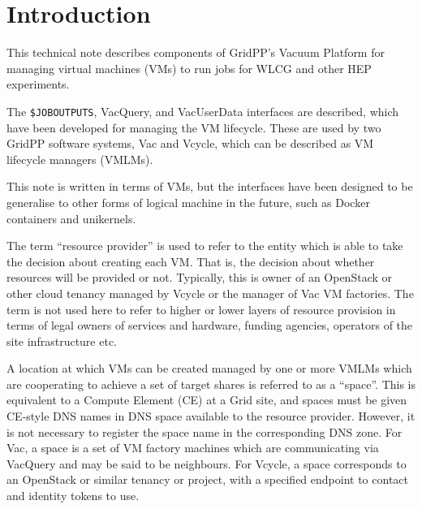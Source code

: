 \documentclass[12pt,a4paper]{article}
\begin{document}
\cleardoublepage

\renewcommand{\thefootnote}{\arabic{footnote}}
\setcounter{footnote}{0}

\tableofcontents

\pagestyle{plain} %
\setcounter{page}{1}


\section{Introduction}
\label{sec:Introduction}

This technical note describes components of GridPP's Vacuum Platform for 
managing virtual machines (VMs) to run jobs for WLCG and other HEP 
experiments.

The \texttt{\$JOBOUTPUTS}, VacQuery, and VacUserData interfaces are described, 
which have been developed for managing the VM lifecycle. These are used 
by two GridPP software systems, Vac and Vcycle, which can be described 
as VM lifecycle managers (VMLMs).

This note is written in terms of VMs, but the interfaces have been 
designed to be generalise to other forms of logical machine in the
future, such as Docker containers and unikernels.

The term ``resource provider'' is used to refer to the entity which is 
able to take the decision about creating each VM. That is, the decision 
about whether resources will be provided or not. Typically, this is owner 
of an OpenStack or other cloud tenancy managed by Vcycle or the manager of Vac VM 
factories. The term is not used here to refer to higher or lower layers of resource
provision in terms of legal owners of services and hardware, funding
agencies, operators of the site infrastructure etc.

A location at which VMs can be created managed by one or more VMLMs
which are cooperating to achieve a set of target shares is referred to
as a ``space''. This is equivalent to a Compute Element (CE) at a Grid site,
and spaces must be given CE-style DNS names in DNS space available to the
resource provider. However, it is not necessary to register the 
space name in the corresponding DNS zone. For Vac, a space is a set
of VM factory machines which are communicating via VacQuery and may
be said to be neighbours. For Vcycle, a space corresponds to an 
OpenStack or similar tenancy or project, with a specified endpoint to 
contact and identity tokens to use.
\end{document}
